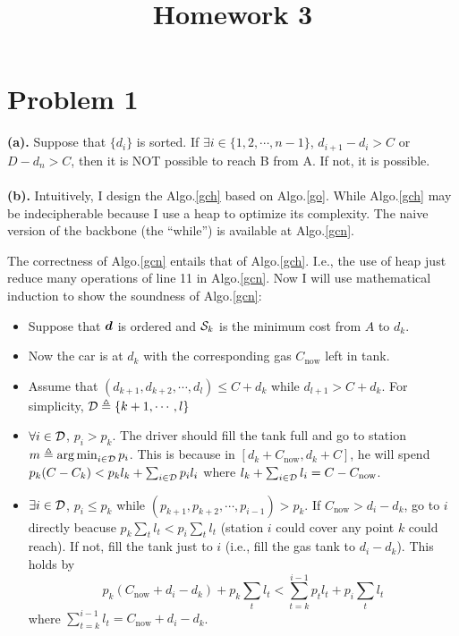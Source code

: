 \documentclass{article}
\begin{document}
\title{\vspace{-1.5cm}Homework 3}
\maketitle
\section*{Problem 1}
\textbf{(a).}
Suppose that $\{d_i\}$ is sorted. If $\exists i\in\{1,2,\cdots,n-1\}$, $d_{i+1}-d_i>C$ or  $D-d_n>C$, then it is NOT possible to reach B from A.
If not, it is possible.
\\\\
\textbf{(b).}
Intuitively, I design the Algo.\ref{gch} based on Algo.\ref{go}. While Algo.\ref{gch} may be indecipherable because I use a heap to optimize its complexity. The naive version of the backbone (the ``while'') is available at Algo.\ref{gcn}.

The correctness of Algo.\ref{gcn} entails that of Algo.\ref{gch}. I.e., the use of heap just reduce many operations of line 11 in Algo.\ref{gcn}.
Now I will use mathematical induction to show the soundness of Algo.\ref{gcn}:
\begin{itemize}
	\item Suppose that $\boldsymbol{d}$ is ordered and $\mathcal{S}_k$ is the minimum cost from  $A$ to  $d_k$.
	\item Now the car is at $d_k$ with the corresponding gas $C_{\mathrm{now}}$ left in tank.
	\item Assume that $(d_{k+1},d_{k+2},\cdots,d_l)\le C+d_k$ while $d_{l+1}>C+d_k$. For simplicity, $\mathcal{D}\triangleq\{k+1,\cdots,l\}$
	\item {}
		$\forall i\in\mathcal{D}$, $p_i>p_k$.
		The driver should fill the tank full and go to station $m\triangleq\mathop{\arg\min}_{i\in\mathcal{D}}p_i$.
		This is because in $[d_k+C_{\mathrm{now}},d_k+C]$, he will spend $p_k(C-C_k)<p_kl_k+\sum_{i\in\mathcal{D}}p_il_i$ where $l_k+\sum_{i\in\mathcal{D}}l_i=C-C_{\mathrm{now}}$.
	\item {}
		$\exists i\in\mathcal{D}$, $p_i\le p_k$ while $(p_{k+1},p_{k+2},\cdots,p_{i-1})>p_k$.
		If $C_{\mathrm{now}}>d_i-d_k$, go to $i$ directly beacuse $p_k\sum_tl_t<p_i\sum_tl_t$ (station $i$ could cover any point $k$ could reach). If not, fill the tank just to $i$ (i.e., fill the gas tank to $d_i-d_k$). This holds by 
	\[
		p_k(C_{\mathrm{now}}+d_i-d_k)+p_k\sum_tl_t
		<
		\sum_{t=k}^{i-1}p_tl_t+p_i\sum_tl_t
	\]where $\sum_{t=k}^{i-1}l_t=C_{\mathrm{now}}+d_i-d_k$.
\end{itemize}
\end{document}
